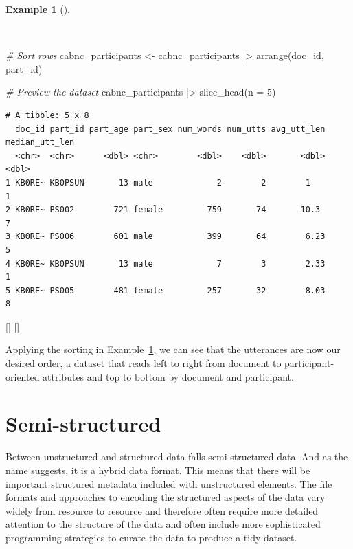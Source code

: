 \documentclass[
  letterpaper,
  krantz1]{latex/krantz-mod}
\newenvironment{Shaded}{\begin{snugshade}}{\end{snugshade}}
\newcommand{\AttributeTok}[1]{\textcolor[rgb]{0.00,0.00,0.00}{#1}}
\newcommand{\CommentTok}[1]{\textcolor[rgb]{0.00,0.00,0.00}{\textit{#1}}}
\newcommand{\DecValTok}[1]{\textcolor[rgb]{0.00,0.00,0.00}{#1}}
\newcommand{\FunctionTok}[1]{\textcolor[rgb]{0.00,0.00,0.00}{#1}}
\newcommand{\NormalTok}[1]{\textcolor[rgb]{0.00,0.00,0.00}{#1}}
\newcommand{\OtherTok}[1]{\textcolor[rgb]{0.00,0.00,0.00}{#1}}
\newcommand{\SpecialCharTok}[1]{\textcolor[rgb]{0.00,0.00,0.00}{#1}}
\newcommand{\cindex}[1]{%
  \StrSubstitute{#1}{_}{\_}[\temp]%
  \index{\temp}%
}
\theoremstyle{definition}
\theoremstyle{definition}
\newtheorem{example}{Example}[chapter]
\theoremstyle{remark}
\begin{document}
\begin{example}[]\protect\hypertarget{exm-curate-cabnc-sort-rows}{}\label{exm-curate-cabnc-sort-rows}

~

\begin{Shaded}
\begin{Highlighting}[numbers=left,,]
\CommentTok{\# Sort rows}
\NormalTok{cabnc\_participants }\OtherTok{\textless{}{-}}
\NormalTok{  cabnc\_participants }\SpecialCharTok{|\textgreater{}}
  \FunctionTok{arrange}\NormalTok{(doc\_id, part\_id)}

\CommentTok{\# Preview the dataset}
\NormalTok{cabnc\_participants }\SpecialCharTok{|\textgreater{}}
  \FunctionTok{slice\_head}\NormalTok{(}\AttributeTok{n =} \DecValTok{5}\NormalTok{)}
\end{Highlighting}
\end{Shaded}

\begin{verbatim}
# A tibble: 5 x 8
  doc_id part_id part_age part_sex num_words num_utts avg_utt_len median_utt_len
  <chr>  <chr>      <dbl> <chr>        <dbl>    <dbl>       <dbl>          <dbl>
1 KB0RE~ KB0PSUN       13 male             2        2        1                 1
2 KB0RE~ PS002        721 female         759       74       10.3               7
3 KB0RE~ PS006        601 male           399       64        6.23              5
4 KB0RE~ KB0PSUN       13 male             7        3        2.33              1
5 KB0RE~ PS005        481 female         257       32        8.03              8
\end{verbatim}

\cindex{arrange()}\cindex{slice_head()}

\end{example}

Applying the sorting in Example~\ref{exm-curate-cabnc-sort-rows}, we can
see that the utterances are now our desired order, a dataset that reads
left to right from document to participant-oriented attributes and top
to bottom by document and participant.

\section{Semi-structured}\label{semi-structured}

Between unstructured and structured data falls semi-structured
data. And as the name suggests, it is a
hybrid data format. This means that there will be important structured
metadata included with unstructured elements. The file
formats and approaches to encoding the structured aspects of the data
vary widely from resource to resource and therefore often require more
detailed attention to the structure of the data and often include more
sophisticated programming strategies to curate the data to produce a
tidy dataset.
\end{document}
